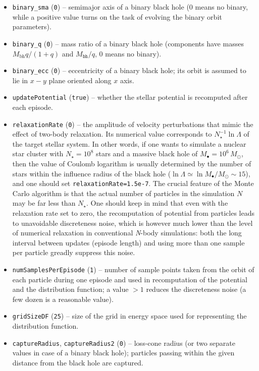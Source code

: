 \documentclass[12pt]{article}
\newcommand{\Nbody}{\textsl{N}-body\xspace}
\begin{document}
\begin{itemize}
\item \texttt{binary_sma}  (\texttt{0}) -- semimajor axis of a binary black hole (0 means no binary, while a positive value turns on the task of evolving the binary orbit parameters).
\item \texttt{binary_q}  (\texttt{0}) -- mass ratio of a binary black hole (components have masses $M_\mathrm{bh}q/(1+q)$ and $M_\texttt{bh}/q$, 0 means no binary).
\item \texttt{binary_ecc}  (\texttt{0}) -- eccentricity of a binary black hole; its orbit is assumed to lie in $x-y$ plane oriented along $x$ axis.
\item \texttt{updatePotential}  (\texttt{true}) -- whether the stellar potential is recomputed after each episode.
\item \texttt{relaxationRate}  (\texttt{0}) -- the amplitude of velocity perturbations that mimic the effect of two-body relaxation. Its numerical value corresponds to $N_\star^{-1}\ln\Lambda$ of the target stellar system. In other words, if one wants to simulate a nuclear star cluster with $N_\star=10^8$ stars and a massive black hole of $M_\bullet=10^6\,M_\odot$, then the value of Coulomb logarithm is usually determined by the number of stars within the influence radius of the black hole ($\ln\Lambda \simeq \ln M_\bullet/M_\odot \sim 15$), and one should set \texttt{relaxationRate=1.5e-7}. The crucial feature of the Monte Carlo algorithm is that the actual number of particles in the simulation $N$ may be far less than $N_\star$.
One should keep in mind that even with the relaxation rate set to zero, the recomputation of potential from particles leads to unavoidable discreteness noise, which is however much lower than the level of numerical relaxation in conventional \Nbody simulations: both the long interval between updates (episode length) and using more than one sample per particle greadly suppress this noise.
\item \texttt{numSamplesPerEpisode}  (\texttt{1}) -- number of sample points taken from the orbit of each particle during one episode and used in recomputation of the potential and the distribution function; a value $>1$ reduces the discreteness noise (a few dozen is a reasonable value).
\item \texttt{gridSizeDF}  (\texttt{25}) -- size of the grid in energy space used for representing the distribution function.
\item \texttt{captureRadius}, \texttt{captureRadius2}  (\texttt{0}) -- loss-cone radius (or two separate values in case of a binary black hole); particles passing within the given distance from the black hole are captured.

\end{itemize}
\end{document}
